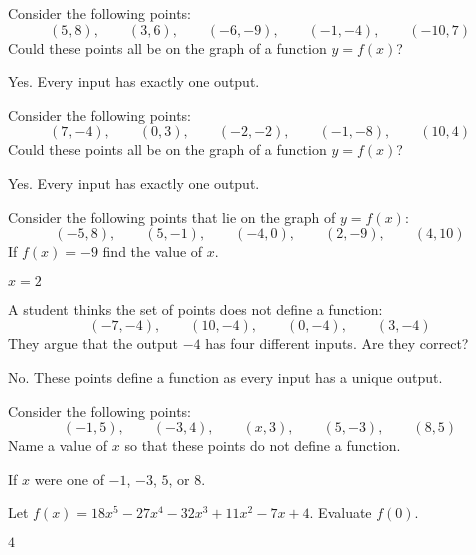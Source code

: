 \begin{exercises}
\begin{exercise} Consider the following points:
\[
(5,8),\qquad (3,6), \qquad(-6,-9), \qquad(-1,-4), \qquad(-10,7)
\]
Could these points all be on the graph of a function $y =f(x)$?
\begin{answer}
Yes.  Every input has exactly one output.
\end{answer}
\end{exercise}


\begin{exercise} Consider the following points:
\[
(7,-4),\qquad (0,3), \qquad(-2,-2), \qquad(-1,-8), \qquad(10,4)
\]
Could these points all be on the graph of a function $y =f(x)$?
\begin{answer}
Yes.  Every input has exactly one output.
\end{answer}
\end{exercise}


\begin{exercise} Consider the following points that lie on the graph of $y =f(x)$:
\[
(-5,8),\qquad (5,-1), \qquad(-4,0), \qquad(2,-9), \qquad(4,10)
\]
If $f(x)=-9$ find the value of $x$.
\begin{answer}
$x=2$
\end{answer}
\end{exercise}

\begin{exercise} A student thinks the set of points does not define a function:
\[
(-7,-4),\qquad (10,-4), \qquad(0,-4), \qquad(3,-4)
\]
They argue that the output $-4$ has four different inputs.  Are they
correct?
\begin{answer}
No.  These points define a function as every input has a unique output.
\end{answer}
\end{exercise}

\begin{exercise} Consider the following points:
\[
(-1,5),\qquad (-3,4), \qquad(x,3), \qquad(5,-3), \qquad(8,5)
\]
Name a value of $x$ so that these points do not define a function. 
\begin{answer}
If $x$ were one of $-1$, $-3$, $5$, or $8$.
\end{answer}
\end{exercise}

\begin{exercise} Let $f(x) = 18x^5-27x^4-32x^3+11x^2 -7x +4$. Evaluate $f(0)$.
\begin{answer}
$4$
\end{answer}
\end{exercise}


\end{exercises}
